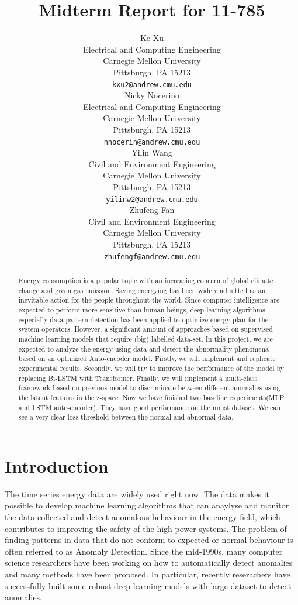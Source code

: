 \documentclass{article}
\title{Midterm Report for 11-785}
\author{%
  Ke Xu \\
  Electrical and Computing Engineering\\
  Carnegie Mellon University\\
  Pittsburgh, PA 15213 \\
  \texttt{kxu2@andrew.cmu.edu} \\

  \And
  Nicky Nocerino \\
  Electrical and Computing Engineering\\
  Carnegie Mellon University\\
  Pittsburgh, PA 15213 \\
  \texttt{nnocerin@andrew.cmu.edu} \\

  \And
  Yilin Wang \\
  Civil and Environment Engineering\\
  Carnegie Mellon University\\
  Pittsburgh, PA 15213 \\
  \texttt{yilinw2@andrew.cmu.edu} \\

  \And
  Zhufeng Fan \\
  Civil and Environment Engineering\\
  Carnegie Mellon University\\
  Pittsburgh, PA 15213 \\
  \texttt{zhufengf@andrew.cmu.edu} \\
}
\begin{document}
\maketitle
\begin{abstract}

Energy consumption is a popular topic with an increasing concern of global climate change and green gas emission. Saving energying has been widely admitted as an inevitable action for the people throughout the world. Since computer intelligence are expected to perform more sensitive than human beings, deep learning algorithms especially data pattern detection has been applied to optimize energy plan for the system operators. However, a significant amount of approaches based on supervised machine
learning models that require (big) labelled data-set. In this project, we are expected to analyze the energy using data and detect the abnormality phenomena based on an optimized Auto-encoder model. Firstly, we will implement and replicate experimental results. Secondly, we will try to improve the performance of the model by replacing Bi-LSTM with Transformer. Finally, we will implement a multi-class framework based on previous model to discriminate between different anomalies using the latent
features in the z-space. Now we have finished two baseline experiments(MLP and LSTM auto-encoder). They have good performance on the mnist dataset. We can see a very clear loss threshold between the normal and abnormal data.


\end{abstract}

\section{Introduction}
The time series energy data are widely used right now. The data makes it possible to develop machine learning algorithms that can anaylyse and monitor the data collected and detect anomalous behaviour in the energy field, which contributes to improving the safety of the high power systems. The problem of finding patterns in data that do not conform to expected or normal behaviour is often referred to as Anomaly Detection. Since the mid-1990s, many computer science researchers have been working on how to automatically detect anomalies and many methods have been proposed. In particular, recently reserachers have successfully built some robust deep learning models with large dataset to detect anomalies. 
\end{document}
